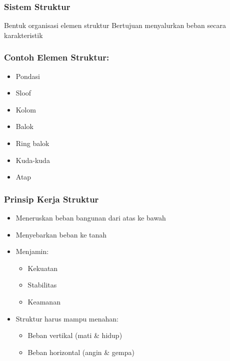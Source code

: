 \documentclass[../main.tex]{subfiles}
\begin{document}
\begin{frame}[t,mycolor=digiPH_red,mytitle=standard,dark]
	\frametitle{Sistem Struktur}

	\tabitem Bentuk organisasi elemen struktur
	\tabitem Bertujuan menyalurkan beban secara karakteristik


\end{frame}
\begin{frame}[t,mycolor=digiPH_leaf,mytitle=standard,dark]
	\frametitle{Contoh Elemen Struktur:}
	\begin{itemize}
		\item Pondasi
		\item Sloof
		\item Kolom
		\item Balok
		\item Ring balok
		\item Kuda-kuda
		\item Atap
	\end{itemize}

\end{frame}

\begin{frame}[t,mycolor=digiPH_leaf,mytitle=standard,dark]


	\frametitle{Prinsip Kerja Struktur}

	\begin{itemize}
		\item Meneruskan beban bangunan dari atas ke bawah
		\item Menyebarkan beban ke tanah
		\item Menjamin:
		      \begin{itemize}
			      \item Kekuatan
			      \item Stabilitas
			      \item Keamanan
		      \end{itemize}
		\item Struktur harus mampu menahan:
		      \begin{itemize}
			      \item Beban vertikal (mati \& hidup)
			      \item Beban horizontal (angin \& gempa)
		      \end{itemize}
	\end{itemize}

\end{frame}
\end{document}
